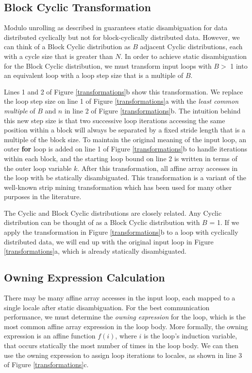 \subsection{Block Cyclic Transformation}\label{subsec:block_cyclic_transformation}

Modulo unrolling as described in \cite{barua1999maps} guarantees static disambiguation for data distributed cyclically but not for block-cyclically distributed data. However, we can think of a Block Cyclic distribution as $B$ adjacent Cyclic distributions, each with a cycle size that is greater than $N$. In order to achieve static disambiguation for the Block Cyclic distribution, we must transform input loops with $B >$ 1 into an equivalent loop with a loop step size that is a multiple of $B$. 

Lines 1 and 2 of Figure \ref{transformations}b show this transformation. We replace the loop step size on line 1 of Figure \ref{transformations}a with the \textit{least common multiple} of $B$ and $n$ in line 2 of Figure \ref{transformations}b. The intuition behind this new step size is that two successive loop iterations accessing the same position within a block will always be separated by a fixed stride length that is a multiple of the block size. To maintain the original meaning of the input loop, an outer \textbf{for} loop is added on line 1 of Figure \ref{transformations}b to handle iterations within each block, and the starting loop bound on line 2 is written in terms of the outer loop variable $k$. After this transformation, all affine array accesses in the loop with be statically disambiguated. This transformation is a variant of the well-known strip mining transformation which has been used for many other purposes in the literature.

The Cyclic and Block Cyclic distributions are closely related. Any Cyclic distribution can be thought of as a Block Cyclic distribution with $B$ = 1. If we apply the transformation in Figure \ref{transformations}b to a loop with cyclically distributed data, we will end up with the original input loop in Figure \ref{transformations}a, which is already statically disambiguated. 

\subsection{Owning Expression Calculation}\label{subsec:owning_expression_calculation}

There may be many affine array accesses in the input loop, each mapped to a single locale after static disambiguation. For the best communication performance, we must determine the \textit{owning expression} for the loop, which is the most common affine array expression in the loop body. More formally, the owning expression is an affine function $f(i)$, where $i$ is the loop's induction variable, that occurs statically the most number of times in the loop body. We can then use the owning expression to assign loop iterations to locales, as shown in line 3 of Figure \ref{transformations}c. 

